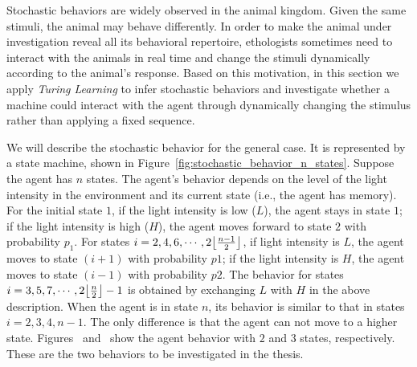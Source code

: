 Stochastic behaviors are widely observed in the animal kingdom. Given the same stimuli, the animal may behave differently. In order to make the animal under investigation reveal all its behavioral repertoire, ethologists sometimes need to interact with the animals in real time and change the stimuli dynamically according to the animal's response. Based on this motivation, in this section we apply \textit{Turing Learning} to infer stochastic behaviors and investigate whether a machine could interact with the agent through dynamically changing the stimulus rather than applying a fixed sequence.

We will describe the stochastic behavior for the general case. It is represented by a state machine, shown in Figure~\ref{fig:stochastic_behavior_n_states}. Suppose the agent has $n$ states. The agent's behavior depends on the level of the light intensity in the environment and its current state (i.e., the agent has memory). For the initial state $1$, if the light intensity is low ($L$), the agent stays in state $1$; if the light intensity is high ($H$), the agent moves forward to state $2$ with probability $p_1$. For states $i = 2, 4, 6, \cdots, 2\floor*{\frac{n-1}{2}}$, if light intensity is $L$, the agent moves to state $(i+1)$ with probability $p1$; if the light intensity is $H$, the agent moves to state $(i-1)$ with probability $p2$. The behavior for states $i=3,5,7,\cdots, 2\floor*{\frac{n}{2}} - 1$ is obtained by exchanging $L$ with $H$ in the above description. When the agent is in state $n$, its behavior is similar to that in states $i=2,3,4,n-1$. The only difference is that the agent can not move to a higher state. Figures~ and~ show the agent behavior with $2$ and $3$ states, respectively. These are the two behaviors to be investigated in the thesis. 

